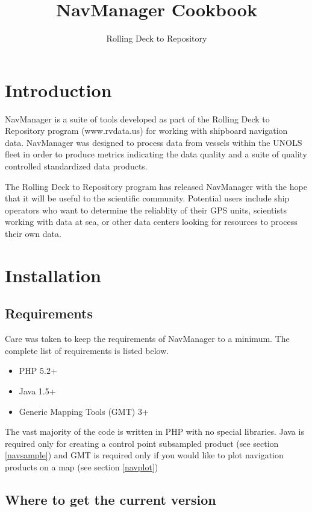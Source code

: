 \documentclass{article}
\title{NavManager Cookbook}
\author{Rolling Deck to Repository}
\begin{document}
	\maketitle
	\newpage
	
	\tableofcontents
	\newpage
	
	\section{Introduction}

NavManager is a suite of tools developed as part of the Rolling Deck to Repository program (www.rvdata.us) for working with shipboard navigation data.  NavManager was designed to process data from vessels within the UNOLS fleet in order to produce metrics indicating the data quality and a suite of quality controlled standardized data products.

The Rolling Deck to Repository program has released NavManager with the hope that it will be useful to the scientific community.  Potential users include ship operators who want to determine the reliablity of their GPS units, scientists working with data at sea, or other data centers looking for resources to process their own data.


	\newpage
	\section{Installation}
		\subsection{Requirements}
		
Care was taken to keep the requirements of NavManager to a minimum.  The complete list of requirements is listed below.
			\begin{itemize}
				\item PHP 5.2+
				\item Java 1.5+
				\item Generic Mapping Tools (GMT) 3+
			\end{itemize}

The vast majority of the code is written in PHP with no special libraries.  Java is required only for creating a control point subsampled product (see section \ref{navsample}) and GMT is required only if you would like to plot navigation products on a map (see section \ref{navplot})
		
		\subsection{Where to get the current version}
		
\end{document}
